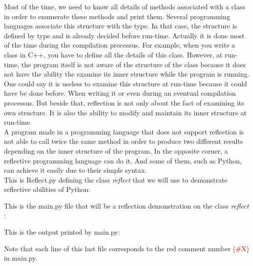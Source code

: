Most of the time, we need to know all details of methods associated with a class in order to enumerate these methods and print them. Several programming languages associate this structure with the type. In that case, the structure is defined by type and is already decided before run-time. Actually it is done most of the time during the compilation processus. For example, when you write a class in C++, you have to define all the details of this class. However, at run-time, the program itself is not aware of the structure of the class because it does not have the ability the examine its inner structure while the program is running.\\
One could say it is useless to examine this structure at run-time because it could have be done before. When writing it or even during an eventual compilation processus. But beside that, reflection is not only about the fact of examining its own structure. It is also the ability to modify and maintain its inner structure at run-time.\\
A program made in a programming language that does not support reflection is not able to call twice the same method in order to produce two different results depending on the inner structure of the program. In the opposite corner, a reflective programming language can do it. And some of them, such as Python, can achieve it easily due to their simple syntax. \cite{assembleforce} \\


This is Reflect.py defining the class \emph{reflect} that we will use to demonstrate reflective abilities of Python:


This is the main.py file that will be a reflection demonstration on the class \emph{reflect} :


This is the output printed by main.py:

Note that each line of this last file corresponds to the red comment number (\textcolor{red}{\#X}) in main.py.\\ 

